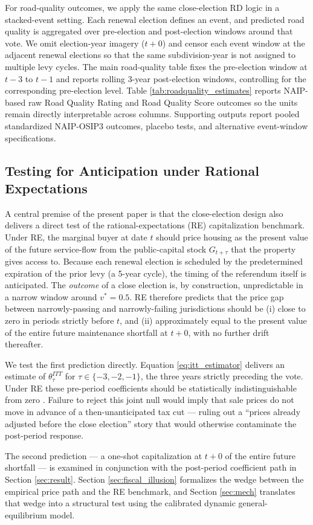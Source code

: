 For road-quality outcomes, we apply the same close-election RD logic in a stacked-event setting. Each renewal election defines an event, and predicted road quality is aggregated over pre-election and post-election windows around that vote. We omit election-year imagery ($t+0$) and censor each event window at the adjacent renewal elections so that the same subdivision-year is not assigned to multiple levy cycles. The main road-quality table fixes the pre-election window at $t-3$ to $t-1$ and reports rolling 3-year post-election windows, controlling for the corresponding pre-election level. Table \ref{tab:roadquality_estimates} reports NAIP-based raw Road Quality Rating and Road Quality Score outcomes so the units remain directly interpretable across columns. Supporting outputs report pooled standardized NAIP-OSIP3 outcomes, placebo tests, and alternative event-window specifications.

\subsection{Testing for Anticipation under Rational Expectations} \label{sec:anticipation}

A central premise of the present paper is that the close-election design also delivers a direct test of the rational-expectations (RE) capitalization benchmark. Under RE, the marginal buyer at date $t$ should price housing as the present value of the future service-flow from the public-capital stock $G_{t+\tau}$ that the property gives access to. Because each renewal election is scheduled by the predetermined expiration of the prior levy (a 5-year cycle), the timing of the referendum itself is anticipated. The {\it outcome} of a close election is, by construction, unpredictable in a narrow window around $v^* = 0.5$. RE therefore predicts that the price gap between narrowly-passing and narrowly-failing jurisdictions should be (i) close to zero in periods strictly before $t$, and (ii) approximately equal to the present value of the entire future maintenance shortfall at $t+0$, with no further drift thereafter.

We test the first prediction directly. Equation \ref{eq:itt_estimator} delivers an estimate of $\theta^{ITT}_{\tau}$ for $\tau \in \{-3, -2, -1\}$, the three years strictly preceding the vote. Under RE these pre-period coefficients should be statistically indistinguishable from zero \citep{bishop2019hedonic}. Failure to reject this joint null would imply that sale prices do not move in advance of a then-unanticipated tax cut --- ruling out a ``prices already adjusted before the close election'' story that would otherwise contaminate the post-period response.

The second prediction --- a one-shot capitalization at $t+0$ of the entire future shortfall --- is examined in conjunction with the post-period coefficient path in Section \ref{sec:result}. Section \ref{sec:fiscal_illusion} formalizes the wedge between the empirical price path and the RE benchmark, and Section \ref{sec:mech} translates that wedge into a structural test using the calibrated dynamic general-equilibrium model.
